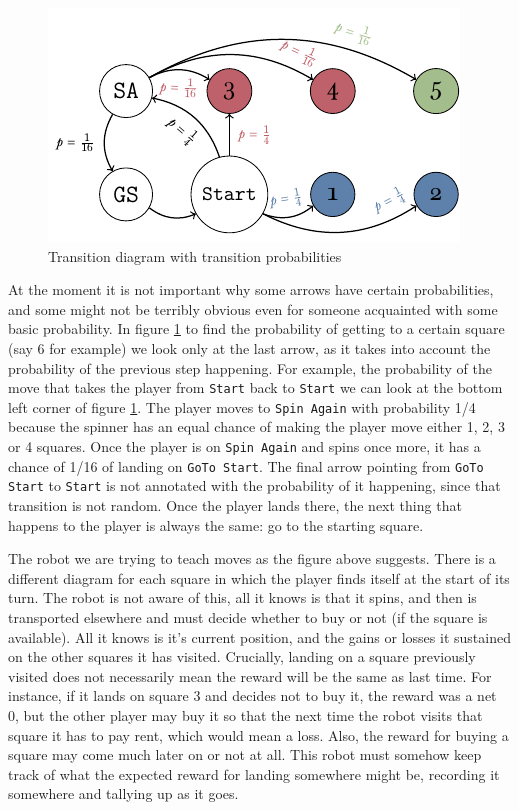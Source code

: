 \begin{figure}[h]
	\centering
	\includegraphics[width=\textwidth]{img/transicion-markov.pdf}
	\caption{Transition diagram with transition probabilities}
	\label{fig:miniopoly-transicion-markov}
\end{figure}

At the moment it is not important why some arrows have certain 
probabilities, and some might not be terribly obvious even for 
someone acquainted with some basic probability. In figure 
\ref{fig:miniopoly-transicion-markov} to find the probability 
of getting to a certain square (say 6 for example) we look only 
at the last arrow, as it takes into account the probability of 
the previous step happening. For example, the probability of 
the move that takes the player from \texttt{Start} back to 
\texttt{Start} we can look at the bottom left corner of figure 
\ref{fig:miniopoly-transicion-markov}. The player moves to 
\texttt{Spin Again} with probability 1/4 because the spinner 
has an equal chance of making the player move either 1, 2, 3 or 
4 squares. Once the player is on \texttt{Spin Again} and spins 
once more, it has a chance of 1/16 of landing on \texttt{GoTo 
Start}. The final arrow pointing from \texttt{GoTo Start} to 
\texttt{Start} is not annotated with the probability of it 
happening, since that transition is not random. Once the player 
lands there, the next thing that happens to the player is 
always the same: go to the starting square.

The robot we are trying to teach moves as the figure above 
suggests. There is a different diagram for each square in which 
the player finds itself at the start of its turn. The robot is 
not aware of this, all it knows is that it spins, and then is 
transported elsewhere and must decide whether to buy or not (if 
the square is available). All it knows is it's current 
position, and the gains or losses it sustained on the other 
squares it has visited. Crucially, landing on a square 
previously visited does not necessarily mean the reward will be 
the same as last time. For instance, if it lands on square 3 
and decides not to buy it, the reward was a net 0, but the 
other player may buy it so that the next time the robot visits 
that square it has to pay rent, which would mean a loss. Also, 
the reward for buying a square may come much later on or not at 
all. This robot must somehow keep track of what the expected 
reward for landing somewhere might be, recording it somewhere 
and tallying up as it goes.

